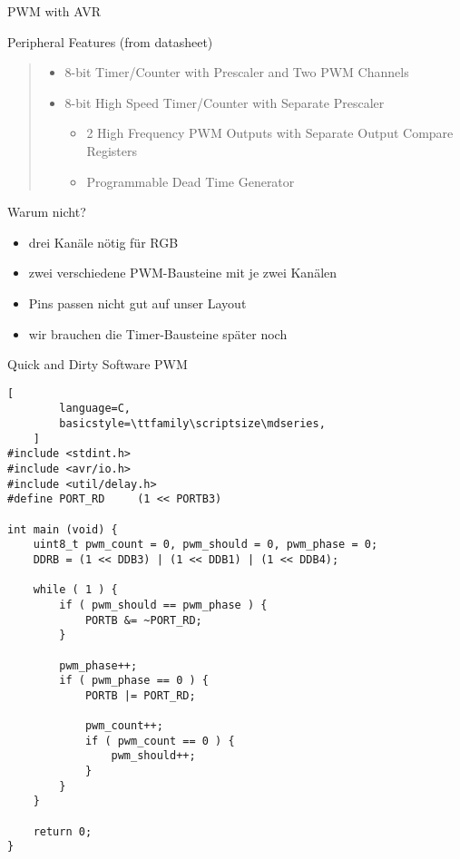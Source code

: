 \documentclass{beamer}
\begin{document}
\begin{frame}{PWM with AVR}
    \begin{block}{Peripheral Features (from datasheet)}
        \begin{quote}
            \begin{itemize}
                \item 8-bit Timer/Counter with Prescaler and Two PWM Channels
                \item 8-bit High Speed Timer/Counter with Separate Prescaler
                    \begin{itemize}
                        \item 2 High Frequency PWM Outputs with Separate Output Compare Registers
                        \item Programmable Dead Time Generator
                    \end{itemize}
            \end{itemize}
        \end{quote}
    \end{block}
    \pause
    \begin{block}{Warum nicht?}
        \begin{itemize}
            \item drei Kanäle nötig für RGB
            \item zwei verschiedene PWM-Bausteine mit je zwei Kanälen
            \item Pins passen nicht gut auf unser Layout
            \item wir brauchen die Timer-Bausteine später noch
        \end{itemize}
    \end{block}
\end{frame}

\begin{frame}[fragile]{Quick and Dirty Software PWM}
    \begin{lstlisting}[
        language=C,
        basicstyle=\ttfamily\scriptsize\mdseries,
    ]
#include <stdint.h>
#include <avr/io.h>
#include <util/delay.h>
#define PORT_RD     (1 << PORTB3)

int main (void) {
    uint8_t pwm_count = 0, pwm_should = 0, pwm_phase = 0;
    DDRB = (1 << DDB3) | (1 << DDB1) | (1 << DDB4);

    while ( 1 ) {
        if ( pwm_should == pwm_phase ) {
            PORTB &= ~PORT_RD;
        }

        pwm_phase++;
        if ( pwm_phase == 0 ) {
            PORTB |= PORT_RD;

            pwm_count++;
            if ( pwm_count == 0 ) {
                pwm_should++;
            }
        }
    }

    return 0;
}
    \end{lstlisting}
\end{frame}
\end{document}
